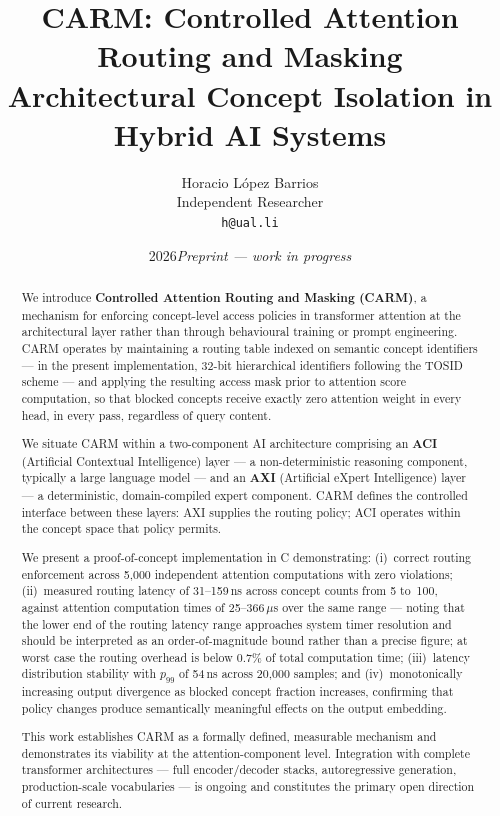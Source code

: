 \documentclass[11pt,a4paper]{article}
\title{\textbf{CARM: Controlled Attention Routing and Masking}\\[0.4em]
       \large Architectural Concept Isolation in Hybrid AI Systems}
\author{Horacio L\'opez Barrios\\[0.3em]
        \normalsize Independent Researcher\\
        \normalsize \texttt{h@ual.li}}
\date{2026\quad\textit{Preprint --- work in progress}}
\theoremstyle{definition}
\begin{document}
\maketitle

\begin{abstract}
We introduce \textbf{Controlled Attention Routing and Masking (CARM)}, a mechanism
for enforcing concept-level access policies in transformer attention at the
architectural layer rather than through behavioural training or prompt engineering.
CARM operates by maintaining a routing table indexed on semantic concept identifiers
--- in the present implementation, 32-bit hierarchical identifiers following the
TOSID scheme --- and applying the resulting access mask prior to attention score
computation, so that blocked concepts receive exactly zero attention weight in every
head, in every pass, regardless of query content.

We situate CARM within a two-component AI architecture comprising an \textbf{ACI}
(Artificial Contextual Intelligence) layer --- a non-deterministic reasoning
component, typically a large language model --- and an \textbf{AXI} (Artificial
eXpert Intelligence) layer --- a deterministic, domain-compiled expert component.
CARM defines the controlled interface between these layers: AXI supplies the routing
policy; ACI operates within the concept space that policy permits.

We present a proof-of-concept implementation in C demonstrating: (i)~correct routing
enforcement across 5{,}000 independent attention computations with zero violations;
(ii)~measured routing latency of 31--159\,ns across concept counts from 5 to~100,
against attention computation times of 25--366\,$\mu$s over the same range --- noting
that the lower end of the routing latency range approaches system timer resolution
and should be interpreted as an order-of-magnitude bound rather than a precise
figure; at worst case the routing overhead is below 0.7\% of total computation time;
(iii)~latency distribution stability with $p_{99}$ of 54\,ns across 20{,}000
samples; and (iv)~monotonically increasing output divergence as blocked concept
fraction increases, confirming that policy changes produce semantically meaningful
effects on the output embedding.

This work establishes CARM as a formally defined, measurable mechanism and
demonstrates its viability at the attention-component level. Integration with
complete transformer architectures --- full encoder/decoder stacks, autoregressive
generation, production-scale vocabularies --- is ongoing and constitutes the primary
open direction of current research.
\end{abstract}
\end{document}
